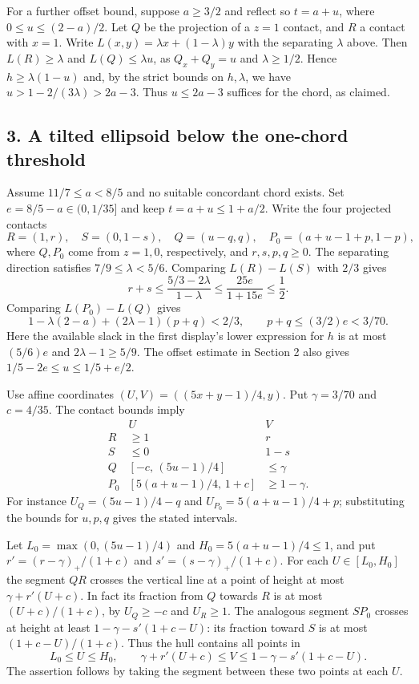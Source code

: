 \documentclass[
  10pt,
]{article}
\begin{document}
For a further offset bound, suppose \(a\ge3/2\) and reflect so
\(t=a+u\), where \(0\le u\le(2-a)/2\). Let \(Q\) be the projection of a
\(z=1\) contact, and \(R\) a contact with \(x=1\). Write
\(L(x,y)=\lambda x+(1-\lambda)y\) with the separating \(\lambda\) above.
Then \(L(R)\ge\lambda\) and \(L(Q)\le\lambda u\), as \(Q_x+Q_y=u\) and
\(\lambda\ge1/2\). Hence \(h\ge\lambda(1-u)\) and, by the strict bounds
on \(h,\lambda\), we have \(u>1-2/(3\lambda)>2a-3\). Thus \(u\le2a-3\)
suffices for the chord, as claimed.

\subsection{3. A tilted ellipsoid below the one-chord
threshold}\label{a-tilted-ellipsoid-below-the-one-chord-threshold}

Assume \(11/7\le a<8/5\) and no suitable concordant chord exists. Set
\(e=8/5-a\in(0,1/35]\) and keep \(t=a+u\le1+a/2\). Write the four
projected contacts \[
 R=(1,r),\quad S=(0,1-s),\quad
 Q=(u-q,q),\quad P_0=(a+u-1+p,1-p),
\] where \(Q,P_0\) come from \(z=1,0\), respectively, and
\(r,s,p,q\ge0\). The separating direction satisfies
\(7/9\le\lambda<5/6\). Comparing \(L(R)-L(S)\) with \(2/3\) gives \[
 r+s\le\frac{5/3-2\lambda}{1-\lambda}
 \le\frac{25e}{1+15e}\le\frac1{2}.
\] Comparing \(L(P_0)-L(Q)\) gives \[
 1-\lambda(2-a)+(2\lambda-1)(p+q)<2/3,
 \qquad p+q\le(3/2)e<3/70 .
\] Here the available slack in the first display's lower expression for
\(h\) is at most \((5/6)e\) and \(2\lambda-1\ge5/9\). The offset
estimate in Section 2 also gives \(1/5-2e\le u\le1/5+e/2\).

Use affine coordinates \((U,V)=((5x+y-1)/4,y)\). Put \(\gamma=3/70\) and
\(c=4/35\). The contact bounds imply \[
 \begin{array}{c|cc}
 & U & V\\ \hline
 R & \ge1 & r\\
 S & \le0 &1-s\\
 Q & [-c,\,(5u-1)/4] & \le\gamma\\
 P_0 & [5(a+u-1)/4,\,1+c] & \ge1-\gamma.
 \end{array}
\] For instance \(U_Q=(5u-1)/4-q\) and \(U_{P_0}=5(a+u-1)/4+p\);
substituting the bounds for \(u,p,q\) gives the stated intervals.

Let \(L_0=\max(0,(5u-1)/4)\) and \(H_0=5(a+u-1)/4\le1\), and put
\(r'=(r-\gamma)_+/(1+c)\) and \(s'=(s-\gamma)_+/(1+c)\). For each
\(U\in[L_0,H_0]\) the segment \(QR\) crosses the vertical line at a
point of height at most \(\gamma+r'(U+c)\). In fact its fraction from
\(Q\) towards \(R\) is at most \((U+c)/(1+c)\), by \(U_Q\ge-c\) and
\(U_R\ge1\). The analogous segment \(SP_0\) crosses at height at least
\(1-\gamma-s'(1+c-U)\): its fraction toward \(S\) is at most
\((1+c-U)/(1+c)\). Thus the hull contains all points in \[
 L_0\le U\le H_0,\qquad \gamma+r'(U+c)\le V\le1-\gamma-s'(1+c-U).
\] The assertion follows by taking the segment between these two points
at each \(U\).
\end{document}
